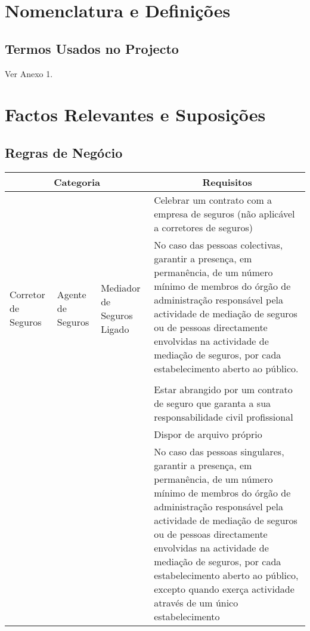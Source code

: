\section{Nomenclatura e Definições}
\subsection{Termos Usados no Projecto}
Ver Anexo 1.
\section{Factos Relevantes e Suposições}
\subsection{Regras de Negócio}
\pagebreak
\begin{table}[t]
\begin{center}
\begin{tabular}{|p{1cm}|p{1cm}|p{1cm}|p{8cm}|}
\hline \multicolumn{3}{|c|}{\T \B \textbf{Categoria}} & \multicolumn{1}{|c|}{\textbf{Requisitos}}\\
\hline \multirow{4}{4cm}{\begin{sideways}\parbox{3cm}{\footnotesize{Corretor de Seguros}}\end{sideways}} & \multirow{4}{4cm}{\T \B \begin{sideways}\parbox{3cm}{\footnotesize{Agente de Seguros}}\end{sideways}} & \multirow{4}{4cm}{\begin{sideways}\parbox{3cm}{\footnotesize{Mediador de Seguros Ligado}}\end{sideways}} & \T \B \scriptsize{Celebrar um contrato com a empresa de seguros (não aplicável  a corretores de seguros)}\\
& & & \scriptsize{No caso das pessoas colectivas, garantir a presença, em permanência, de um número mínimo de membros do órgão de administração responsável pela actividade de mediação de seguros ou de pessoas directamente envolvidas na actividade de mediação de seguros, por cada estabelecimento aberto ao público.}\\
& & &\\
\cline{3-4} & \multicolumn{2}{|c|}{ } & \T \B \scriptsize{Estar abrangido por um contrato de seguro que garanta a sua responsabilidade civil profissional}\\
& \multicolumn{2}{|c|}{ } & \scriptsize{Dispor de arquivo próprio}\\
& \multicolumn{2}{|c|}{ } & \scriptsize{No caso das pessoas singulares, garantir a presença, em permanência, de um número mínimo de membros do órgão de administração responsável pela actividade de mediação de seguros ou de pessoas directamente envolvidas na actividade de mediação de seguros, por cada estabelecimento aberto ao público, excepto quando exerça actividade através de um único estabelecimento}\\

\end{tabular}
\end{center}
\end{table}
